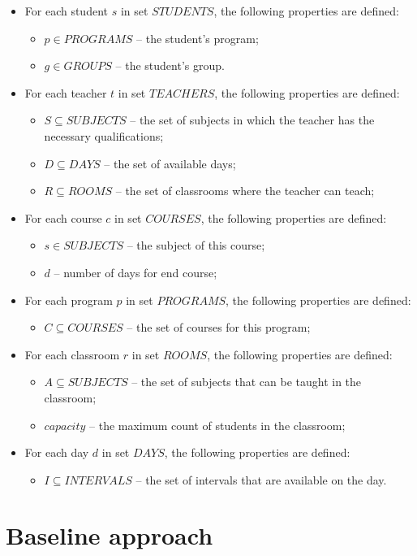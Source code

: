 \documentclass{article}
\begin{document}
\begin{itemize}
    \setlength\itemsep{0.05em}
    \item For each student $s$ in set $STUDENTS$, the following properties are defined:
    \begin{itemize}
        \setlength\itemsep{0.05em}
        \item $p \in PROGRAMS$ -- the student's program;
        \item $g \in GROUPS$ -- the student's group.
    \end{itemize}

    \item For each teacher $t$ in set $TEACHERS$, the following properties are defined:
    \begin{itemize}
        \setlength\itemsep{0.05em}
        \item $S \subseteq SUBJECTS$ -- the set of subjects in which the teacher has the necessary qualifications;
        \item $D \subseteq DAYS$ -- the set of available days;
        \item $R \subseteq ROOMS$ -- the set of classrooms where the teacher can teach; 
    \end{itemize}

    \item For each course $c$ in set $COURSES$, the following properties are defined:
    \begin{itemize}
        \setlength\itemsep{0.05em}
        \item $s \in SUBJECTS$ -- the subject of this course;
        \item $d$ -- number of days for end course;
    \end{itemize}

    \item For each program $p$ in set $PROGRAMS$, the following properties are defined:
    \begin{itemize}
        \setlength\itemsep{0.05em}
        \item $C \subseteq COURSES$ -- the set of courses for this program;
    \end{itemize}
    
    \item For each classroom $r$ in set $ROOMS$, the following properties are defined:
    \begin{itemize}
        \setlength\itemsep{0.05em}
        \item $A \subseteq SUBJECTS$ -- the set of subjects that can be taught in the classroom;
        \item $capacity$ -- the maximum count of students in the classroom;
    \end{itemize}

    \item For each day $d$ in set $DAYS$, the following properties are defined:
    \begin{itemize}
        \setlength\itemsep{0.05em}
        \item $I \subseteq INTERVALS$ -- the set of intervals that are available on the day.
    \end{itemize}

\end{itemize}

\section{Baseline approach}





\end{document}

